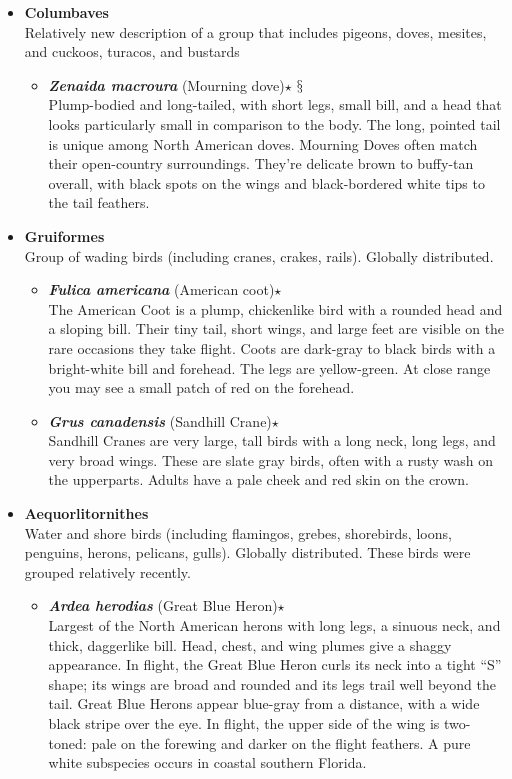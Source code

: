 \documentclass[a4paper,12pt]{article}
\begin{document}
\begin{description}
\begin{itemize}
\begin{itemize}
\begin{itemize}
    \end{itemize}
    \item {\textbf{Columbaves}} \\ Relatively new description of a group that includes pigeons, doves, mesites, and cuckoos, turacos, and bustards
    \begin{itemize}
      \item{\textbf{\textit{Zenaida macroura}} (Mourning dove)$\star$ $\mathsection$} \\ Plump-bodied and long-tailed, with short legs, small bill, and a head that looks particularly small in comparison to the body. The long, pointed tail is unique among North American doves. Mourning Doves often match their open-country surroundings. They’re delicate brown to buffy-tan overall, with black spots on the wings and black-bordered white tips to the tail feathers.
    \end{itemize}
    \item {\textbf{Gruiformes}} \\ Group of wading birds (including cranes, crakes, rails). Globally distributed.
    \begin{itemize}
      \item{\textbf{\textit{Fulica americana}} (American coot)$\star$} \\ The American Coot is a plump, chickenlike bird with a rounded head and a sloping bill. Their tiny tail, short wings, and large feet are visible on the rare occasions they take flight. Coots are dark-gray to black birds with a bright-white bill and forehead. The legs are yellow-green. At close range you may see a small patch of red on the forehead.
      \item{\textbf{\textit{Grus canadensis}} (Sandhill Crane)$\star$} \\ Sandhill Cranes are very large, tall birds with a long neck, long legs, and very broad wings. These are slate gray birds, often with a rusty wash on the upperparts. Adults have a pale cheek and red skin on the crown.
    \end{itemize}  
    \item {\textbf{Aequorlitornithes}} \\ Water and shore birds (including flamingos, grebes, shorebirds, loons, penguins, herons, pelicans, gulls). Globally distributed. These birds were grouped relatively recently.
    \begin{itemize}
      \item{\textbf{\textit{Ardea herodias}} (Great Blue Heron)$\star$} \\ Largest of the North American herons with long legs, a sinuous neck, and thick, daggerlike bill. Head, chest, and wing plumes give a shaggy appearance. In flight, the Great Blue Heron curls its neck into a tight “S” shape; its wings are broad and rounded and its legs trail well beyond the tail. Great Blue Herons appear blue-gray from a distance, with a wide black stripe over the eye. In flight, the upper side of the wing is two-toned: pale on the forewing and darker on the flight feathers. A pure white subspecies occurs in coastal southern Florida.

\end{itemize}
\end{itemize}
\end{itemize}
\end{description}
\end{document}
